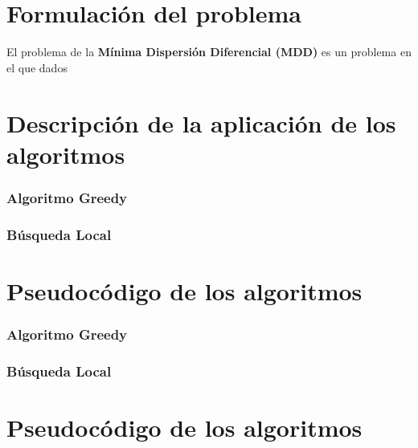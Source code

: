 \clearpage
\maketitle %
\thispagestyle{empty}

\newpage %

\tableofcontents %

\newpage




\part{Formulación del problema}

El problema de la \textbf{Mínima Dispersión Diferencial (MDD)} es un problema en el que dados 


\part{Descripción de la aplicación de los algoritmos}



\section{Algoritmo Greedy}


\section{Búsqueda Local}





\part{Pseudocódigo de los algoritmos}



\section{Algoritmo Greedy}


\section{Búsqueda Local}





\part{Pseudocódigo de los algoritmos}

\newpage

\nocite{*}




